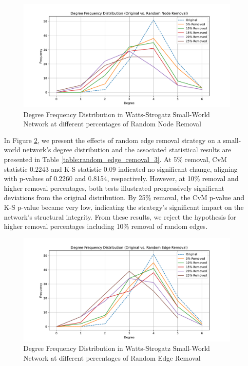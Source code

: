 \documentclass[conference]{IEEEtran} %
\begin{document}
\begin{figure}[t]
  \centering
  \includegraphics[width=1.1\linewidth]{small_world_network_frequency_distribution_plot_Random Node Removal.pdf}
  \caption{Degree Frequency Distribution in Watts-Strogatz Small-World Network at different percentages of Random Node Removal}
  \label{fig:15.3}
\end{figure}


In Figure \ref{fig:15.4}, we present the effects of random edge removal strategy on a small-world network's degree distribution and the associated statistical results are presented in Table \ref{table:random_edge_removal_3}. At 5\% removal, CvM statistic 0.2243 and K-S statistic 0.09 indicated no significant change, aligning with p-values of 0.2260 and 0.8154, respectively. However, at 10\% removal and higher removal percentages, both tests illustrated progressively significant deviations from the original distribution. By 25\% removal, the CvM p-value and K-S p-value became very low, indicating the strategy's significant impact on the network's structural integrity. From these results, we reject the hypothesis for higher removal percentages including 10\% removal of random edges.

\begin{figure}[t]
  \centering
  \includegraphics[width=1.1\linewidth]{small_world_network_frequency_distribution_plot_Random Edge Removal.pdf}
  \caption{Degree Frequency Distribution in Watts-Strogatz Small-World Network at different percentages of Random Edge Removal}
  \label{fig:15.4}
\end{figure}
\end{document}
